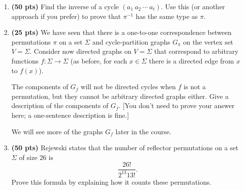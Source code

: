 \documentclass[11pt]{article}
\newcommand{\points}[1]{\textbf{({#1} pts)}}
\begin{document}
\begin{enumerate}
    \item \points{50} Find the inverse of a cycle $(a_1\ a_2\ \cdots\ a_t)$.
        Use this (or another approach if you prefer) to prove that $\pi^{-1}$
        has the same type as $\pi$.

    \item \points{25} We have seen that there is a one-to-one correspondence
        between permutations $\pi$ on a set $\Sigma$ and cycle-partition graphs
        $G_\pi$ on the vertex set $V=\Sigma$.  Consider now directed graphs on
        $V=\Sigma$ that correspond to arbitrary functions $f:\Sigma\to\Sigma$
        (as before, for each $x\in\Sigma$ there is a directed edge from $x$ to
        $f(x)$).
            
        The components of $G_f$ will not be directed cycles when $f$ is not
        a permutation, but they cannot be arbitrary directed graphs either. 
        Give a description of the components of $G_f$. [You don't need to prove
        your answer here; a one-sentence description is fine.]

        We will see more of the graphs $G_f$ later in the course.

    \item \points{50} Rejewski states that the number of reflector permutations
        on a set $\Sigma$ of size $26$ is
        \[
            \frac{26!}{2^{13}13!}.
        \]
        Prove this formula by explaining how it counts these permutations.


\end{enumerate}
\end{document}
